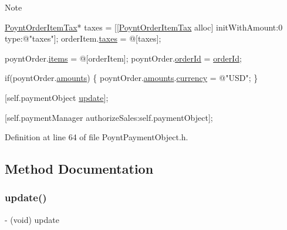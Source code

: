 \begin{DoxyNote}{Note}
\begin{DoxyCode}
\hyperlink{interface_poynt_order_item_tax}{PoyntOrderItemTax}* taxes = [[\hyperlink{interface_poynt_order_item_tax}{PoyntOrderItemTax} alloc] initWithAmount:0 
      type:\textcolor{stringliteral}{@"taxes"}];
orderItem.\hyperlink{interface_poynt_order_item_object_a24101b932074a386b535ab58e819bf71}{taxes} = @[taxes];

poyntOrder.\hyperlink{interface_poynt_order_object_a79b667618eb44106221f198156b54dd2}{items} = @[orderItem];
poyntOrder.\hyperlink{interface_poynt_order_object_aac2b120e80b4b9e69c3a577c4f31ed31}{orderId} = \hyperlink{interface_poynt_payment_object_aac2b120e80b4b9e69c3a577c4f31ed31}{orderId};

\textcolor{keywordflow}{if}(poyntOrder.\hyperlink{interface_poynt_order_object_a24782f14a239c62d29bf0389fb7fdf8d}{amounts})
\{
 poyntOrder.\hyperlink{interface_poynt_order_object_a24782f14a239c62d29bf0389fb7fdf8d}{amounts}.\hyperlink{interface_poynt_payment_amount_object_a71a9104f71558df8791cedc5e81941a3}{currency} = \textcolor{stringliteral}{@"USD"};
\}

[\textcolor{keyword}{self}.paymentObject \hyperlink{interface_poynt_payment_object_ac5c54df7ed3b930268c8d7752c101725}{update}];

[\textcolor{keyword}{self}.paymentManager authorizeSales:\textcolor{keyword}{self}.paymentObject];
\end{DoxyCode}
 
\end{DoxyNote}


Definition at line 64 of file Poynt\+Payment\+Object.\+h.



\subsection{Method Documentation}
\hypertarget{interface_poynt_payment_object_ac5c54df7ed3b930268c8d7752c101725}{}\label{interface_poynt_payment_object_ac5c54df7ed3b930268c8d7752c101725} 
\subsubsection{\texorpdfstring{update()}{update()}}
{\footnotesize\ttfamily -\/ (void) update \begin{DoxyParamCaption}{ }\end{DoxyParamCaption}}



